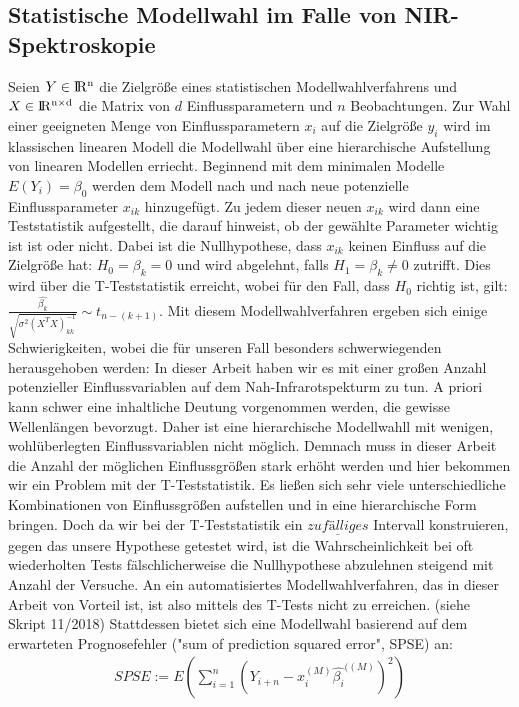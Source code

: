 	\subsection{Statistische Modellwahl im Falle von NIR-Spektroskopie}
	\label{ssec:mlr}
	Seien $Y\in \rm I\!R^{n}$ die Zielgröße eines statistischen Modellwahlverfahrens und $X \in \rm I\!R^{n \times d}$ die Matrix von $d$ Einflussparametern und $n$ Beobachtungen.
	Zur Wahl einer geeigneten Menge von Einflussparametern $x_i$ auf die Zielgröße $y_i$  wird im klassischen linearen Modell die Modellwahl über eine hierarchische Aufstellung von linearen Modellen erriecht.
	Beginnend mit dem minimalen Modelle $E(Y_i) = \beta_0$ werden dem Modell nach und nach neue potenzielle Einflussparameter $x_{ik}$ hinzugefügt.
	Zu jedem dieser neuen $x_{ik}$ wird dann eine Teststatistik aufgestellt, die darauf hinweist, ob der gewählte Parameter wichtig ist ist oder nicht.
	Dabei ist die Nullhypothese, dass $x_{ik}$ keinen Einfluss auf die Zielgröße hat: $ H_0 = \beta_k = 0$ und wird abgelehnt, falls $H_1 = \beta_k \neq 0$ zutrifft.
	Dies wird über die T-Teststatistik erreicht,  wobei für den Fall, dass $H_0$ richtig ist, gilt: $\frac{\hat{\beta_k}}{\sqrt{\sigma^2(X^TX)^{-1}_{kk}}} \sim t_{n-(k+1)}$.
	Mit diesem Modellwahlverfahren ergeben sich einige Schwierigkeiten, wobei die für unseren Fall besonders schwerwiegenden herausgehoben werden: In dieser Arbeit haben wir es mit einer großen Anzahl potenzieller Einflussvariablen auf dem Nah-Infrarotspekturm zu tun.
	A priori kann schwer eine inhaltliche Deutung vorgenommen werden, die gewisse Wellenlängen bevorzugt. Daher ist eine hierarchische Modellwahll mit wenigen, wohlüberlegten Einflussvariablen nicht möglich.
	Demnach muss in dieser Arbeit die Anzahl der möglichen Einflussgrößen stark erhöht werden und hier bekommen wir ein Problem mit der T-Teststatistik.
	Es ließen sich sehr viele unterschiedliche Kombinationen von Einflussgrößen aufstellen und in eine hierarchische Form bringen.
	Doch da wir bei der T-Teststatistik ein $\underline{zufälliges}$ Intervall konstruieren, gegen das unsere Hypothese getestet wird, ist die Wahrscheinlichkeit bei oft wiederholten Tests fälschlicherweise die Nullhypothese abzulehnen steigend mit Anzahl der Versuche.
	An ein automatisiertes Modellwahlverfahren, das in dieser Arbeit von Vorteil ist, ist also mittels des T-Tests nicht zu erreichen. (siehe Skript 11/2018)
	Stattdessen bietet sich eine Modellwahl basierend auf dem erwarteten Prognosefehler ("sum of prediction squared error", SPSE) an:
	\begin{align}
		SPSE := E(\sum_{i=1}^{n} (Y_{i+n} - x_{i}^{(M)}\hat{\beta_i}^{((M)})^2)
	\end{align}

